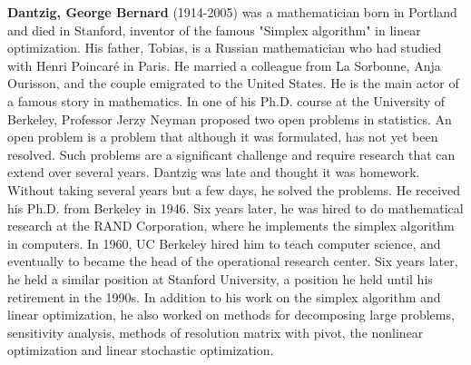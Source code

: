 \textbf{Dantzig, George Bernard} (1914-2005) was a mathematician born in Portland and died in Stanford, inventor of the famous "Simplex algorithm" in linear optimization. His father, Tobias, is a Russian mathematician who had studied with Henri Poincaré in Paris. He married a colleague from La Sorbonne, Anja Ourisson, and the couple emigrated to the United States. He is the main actor of a famous story in mathematics. In one of his Ph.D. course at the University of Berkeley, Professor Jerzy Neyman proposed two open problems in statistics. An open problem is a problem that although it was formulated, has not yet been resolved. Such problems are a significant challenge and require research that can extend over several years. Dantzig was late and thought it was homework. Without taking several years but a few days, he solved the problems. He received his Ph.D. from Berkeley in 1946. Six years later, he was hired to do mathematical research at the RAND Corporation, where he implements the simplex algorithm in computers. In 1960, UC Berkeley hired him to teach computer science, and eventually to became the head of the operational research center. Six years later, he held a similar position at Stanford University, a position he held until his retirement in the 1990s. In addition to his work on the simplex algorithm and linear optimization, he also worked on methods for decomposing large problems, sensitivity analysis, methods of resolution matrix with pivot, the nonlinear optimization and linear stochastic optimization.

